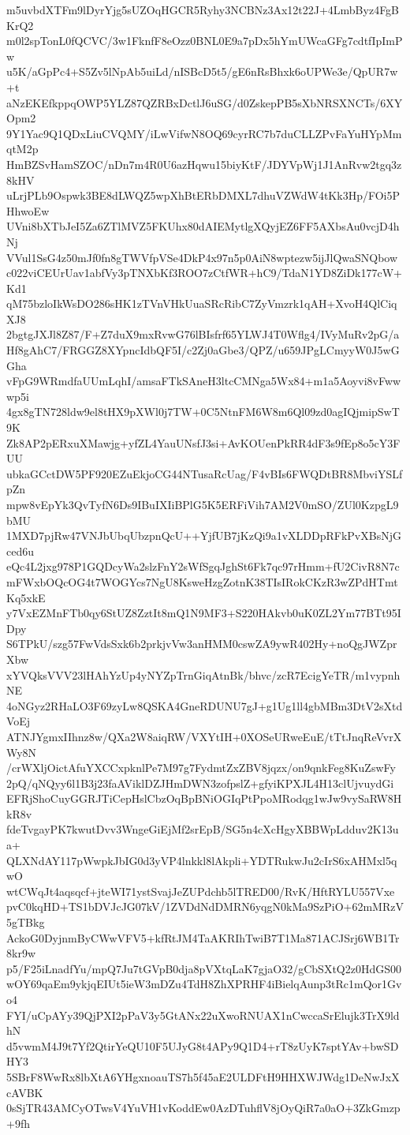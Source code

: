 m5uvbdXTFm9lDyrYjg5sUZOqHGCR5Ryhy3NCBNz3Ax12t22J+4LmbByz4FgBKrQ2
m0l2spTonL0fQCVC/3w1FknfF8eOzz0BNL0E9a7pDx5hYmUWcaGFg7cdtfIpImPw
u5K/aGpPc4+S5Zv5lNpAb5uiLd/nISBcD5t5/gE6nRsBhxk6oUPWe3e/QpUR7w+t
aNzEKEfkppqOWP5YLZ87QZRBxDctlJ6uSG/d0ZskepPB5sXbNRSXNCTs/6XYOpm2
9Y1Yac9Q1QDxLiuCVQMY/iLwVifwN8OQ69cyrRC7b7duCLLZPvFaYuHYpMmqtM2p
HmBZSvHamSZOC/nDn7m4R0U6azHqwu15biyKtF/JDYVpWj1J1AnRvw2tgq3z8kHV
uLrjPLb9Ospwk3BE8dLWQZ5wpXhBtERbDMXL7dhuVZWdW4tKk3Hp/FOi5PHhwoEw
UVni8bXTbJeI5Za6ZTlMVZ5FKUhx80dAIEMytlgXQyjEZ6FF5AXbsAu0vcjD4hNj
VVul1SsG4z50mJf0fn8gTWVfpVSe4DkP4x97n5p0AiN8wptezw5ijJlQwaSNQbow
c022viCEUrUav1abfVy3pTNXbKf3ROO7zCtfWR+hC9/TdaN1YD8ZiDk177cW+Kd1
qM75bzloIkWsDO286sHK1zTVnVHkUuaSRcRibC7ZyVmzrk1qAH+XvoH4QlCiqXJ8
2bgtgJXJl8Z87/F+Z7duX9mxRvwG76lBIsfrf65YLWJ4T0Wflg4/IVyMuRv2pG/a
Hf8gAhC7/FRGGZ8XYpncIdbQF5I/c2Zj0aGbe3/QPZ/u659JPgLCmyyW0J5wGGha
vFpG9WRmdfaUUmLqhI/amsaFTkSAneH3ltcCMNga5Wx84+m1a5Aoyvi8vFwwwp5i
4gx8gTN728ldw9el8tHX9pXWl0j7TW+0C5NtnFM6W8m6Ql09zd0agIQjmipSwT9K
Zk8AP2pERxuXMawjg+yfZL4YauUNsfJ3si+AvKOUenPkRR4dF3s9fEp8o5cY3FUU
ubkaGCctDW5PF920EZuEkjoCG44NTusaRcUag/F4vBIs6FWQDtBR8MbviYSLfpZn
mpw8vEpYk3QvTyfN6Ds9IBuIXIiBPlG5K5ERFiVih7AM2V0mSO/ZUl0KzpgL9bMU
1MXD7pjRw47VNJbUbqUbzpnQcU++YjfUB7jKzQi9a1vXLDDpRFkPvXBsNjGced6u
eQc4L2jxg978P1GQDcyWa2slzFnY2sWfSgqJghSt6Fk7qc97rHmm+fU2CivR8N7c
mFWxbOQcOG4t7WOGYcs7NgU8KsweHzgZotnK38TIsIRokCKzR3wZPdHTmtKq5xkE
y7VxEZMnFTb0qy6StUZ8ZztIt8mQ1N9MF3+S220HAkvb0uK0ZL2Ym77BTt95IDpy
S6TPkU/szg57FwVdsSxk6b2prkjvVw3anHMM0cswZA9ywR402Hy+noQgJWZprXbw
xYVQksVVV23lHAhYzUp4yNYZpTrnGiqAtnBk/bhvc/zcR7EcigYeTR/m1vypnhNE
4oNGyz2RHaLO3F69zyLw8QSKA4GneRDUNU7gJ+g1Ug1ll4gbMBm3DtV2sXtdVoEj
ATNJYgmxIIhnz8w/QXa2W8aiqRW/VXYtIH+0XOSeURweEuE/tTtJnqReVvrXWy8N
/crWXljOictAfuYXCCxpknlPe7M97g7FydmtZxZBV8jqzx/on9qnkFeg8KuZswFy
2pQ/qNQyy6l1B3j23faAViklDZJHmDWN3zofpslZ+gfyiKPXJL4H13clUjvuydGi
EFRjShoCuyGGRJTiCepHslCbzOqBpBNiOGIqPtPpoMRodqg1wJw9vySaRW8HkR8v
fdeTvgayPK7kwutDvv3WngeGiEjMf2srEpB/SG5n4cXcHgyXBBWpLdduv2K13ua+
QLXNdAY117pWwpkJbIG0d3yVP4lnkkl8lAkpli+YDTRukwJu2cIrS6xAHMxl5qwO
wtCWqJt4aqsqcf+jteWI71ystSvajJeZUPdchb5lTRED00/RvK/HftRYLU557Vxe
pvC0kqHD+TS1bDVJcJG07kV/1ZVDdNdDMRN6yqgN0kMa9SzPiO+62mMRzV5gTBkg
AckoG0DyjnmByCWwVFV5+kfRtJM4TaAKRIhTwiB7T1Ma871ACJSrj6WB1Tr8kr9w
p5/F25iLnadfYu/mpQ7Ju7tGVpB0dja8pVXtqLaK7gjaO32/gCbSXtQ2z0HdGS00
wOY69qaEm9ykjqEIUt5ieW3mDZu4TdH8ZhXPRHF4iBielqAunp3tRc1mQor1Gvo4
FYI/uCpAYy39QjPXI2pPaV3y5GtANx22uXwoRNUAX1nCwccaSrElujk3TrX9ldhN
d5vwmM4J9t7Yf2QtirYeQU10F5UJyG8t4APy9Q1D4+rT8zUyK7sptYAv+bwSDHY3
5SBrF8WwRx8lbXtA6YHgxnoauTS7h5f45aE2ULDFtH9HHXWJWdg1DeNwJxXcAVBK
0sSjTR43AMCyOTwsV4YuVH1vKoddEw0AzDTuhflV8jOyQiR7a0aO+3ZkGmzp+9fh
